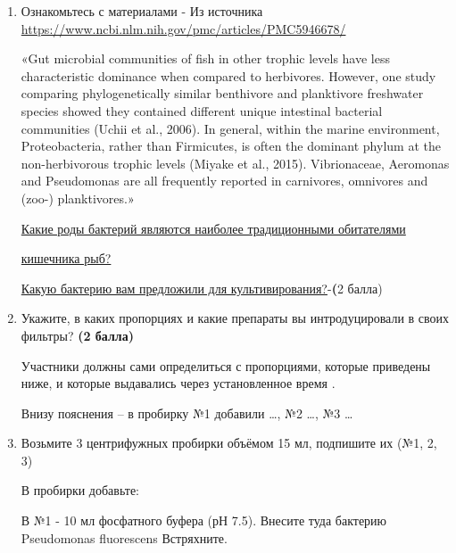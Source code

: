 
\begin{enumerate}
    \item Ознакомьтесь с материалами - Из источника \url{https://www.ncbi.nlm.nih.gov/pmc/articles/PMC5946678/} 
 
    
    «Gut microbial communities of fish in other trophic levels have less characteristic dominance when compared to herbivores. However, one study comparing \linebreak phylogenetically similar benthivore and planktivore freshwater species showed they contained different unique intestinal bacterial communities (Uchii et al., 2006). In general, within the marine environment, Proteobacteria, rather than Firmicutes, is often the dominant phylum at the non-herbivorous trophic levels (Miyake et al., 2015). Vibrionaceae, Aeromonas and Pseudomonas are all frequently reported in carnivores, omnivores and (zoo-) planktivores.»

    \underline{Какие роды бактерий являются наиболее традиционными обитателями} 

    \underline{кишечника рыб?}


    \underline{Какую бактерию вам предложили для культивирования?}-\textbf(2 балла)


    \item Укажите, в каких пропорциях и какие препараты вы интродуцировали в своих фильтры? \textbf{(2 балла)}
    
    \explanationSection

    Участники должны сами определиться с пропорциями, которые приведены ниже, и которые выдавались через установленное время . 

    Внизу пояснения – в пробирку №1 добавили \dots, №2 \dots, №3 \dots

    \item Возьмите 3 центрифужных пробирки объёмом 15 мл, подпишите их (№1, 2, 3) 
    
    В пробирки добавьте:
    
    В №1 -  10 мл фосфатного буфера (рН 7.5). Внесите туда бактерию Pseudomonas fluorescens Встряхните.
    

\end{enumerate}
